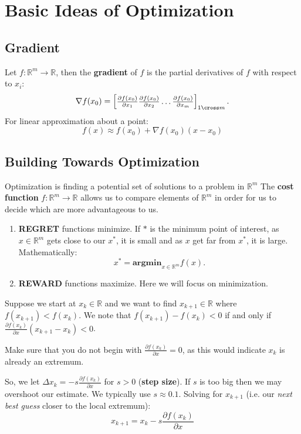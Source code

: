 \chapter{Basic Ideas of Optimization}
\section{Gradient}
Let \(f: \mathbb{R}^m \to \mathbb{R} \), then the \textbf{gradient} of \(f\) is the partial derivatives of \(f\) with respect to \(x_i\):
\[
  \nabla f(x_0) =
  \begin{bmatrix}
    \frac{\partial f(x_0)}{\partial x_1} \frac{\partial f(x_0)}{\partial x_2} \ldots \frac{\partial f(x_0)}{\partial x_m}
  \end{bmatrix}_{1 \cross m}.
\] 
For linear approximation about a point:
\[
  f(x) \approx f(x_0) + \nabla f(x_0) (x - x_0)
\]

\section{Building Towards Optimization}
Optimization is finding a potential set of solutions to a problem in \(\mathbb{R} ^m\) The \textbf{cost function} \(f: \mathbb{R} ^m \to \mathbb{R} \) allows us to compare elements of \(\mathbb{R} ^m\) in order for us to decide which are more advantageous to us.

\begin{enumerate}
  \item \textbf{REGRET} functions minimize. If \(*\) is the minimum point of interest, as \(x \in \mathbb{R} ^m\)  gets close to our \(x^*\), it is small and as \(x\) get far from \(x^*\), it is large. Mathematically:
  \[
    x^* = \mathbf{argmin}_{x \in \mathbb{R}^m} f(x).
  \]
  \item \textbf{REWARD} functions maximize. Here we will focus on minimization.
\end{enumerate}

Suppose we start at \(x_k \in \mathbb{R} \) and we want to find \(x_{k +1} \in \mathbb{R}\) where \(f(x_{k+1}) < f(x_k)\). We note that \(f(x_{k+1}) - f(x_k) < 0\) if and only if \(\frac{\partial f(x_k)}{\partial x} (x_{k+1}-x_k) < 0\).

\begin{remark}
  Make sure that you do not begin with \(\frac{\partial f(x_k)}{\partial x} = 0\), as this would indicate \(x_k\) is already an extremum.
\end{remark}

So, we let \(\Delta x_k = -s \frac{\partial f(x_k)}{\partial x} \) for \(s>0\) (\textbf{step size}). If \(s\) is too big then we may overshoot our estimate. We typically use \(s \approx 0.1\). Solving for \(x_{k+1}\) (i.e. our \emph{next best guess} closer to the local extremum):
\[
  x_{k+1} = x_k -s \frac{\partial f(x_k)}{\partial x} 
\]